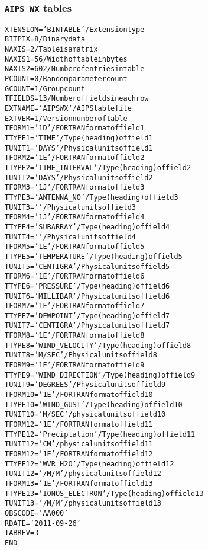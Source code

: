 \documentclass[twoside]{article}
\newcommand{\Hi}[1]{\textcolor{hicol}{#1}}
\begin{document}
\subsubsection{{\tt AIPS WX} tables}
\label{Appe:WXtable}
\begin{alltt}
XTENSION= 'BINTABLE'           / Extension type
BITPIX  =                    8 / Binary data
NAXIS   =                    2 / Table is a matrix
\Hi{NAXIS1  =                   56 / Width of table in bytes}
NAXIS2  =                  602 / Number of entries in table
PCOUNT  =                    0 / Random parameter count
GCOUNT  =                    1 / Group count
TFIELDS =                   13 / Number of fields in each row
EXTNAME = 'AIPS WX '           / AIPS table file
EXTVER  =                    1 / Version number of table
TFORM1  = '1D      '           / FORTRAN format of field  1
TTYPE1  = 'TIME            '   / Type (heading) of field  1
TUNIT1  = 'DAYS    '           / Physical units of field  1
TFORM2  = '1E      '           / FORTRAN format of field  2
TTYPE2  = 'TIME_INTERVAL   '   / Type (heading) of field  2
TUNIT2  = 'DAYS    '           / Physical units of field  2
TFORM3  = '1J      '           / FORTRAN format of field  3
TTYPE3  = 'ANTENNA_NO      '   / Type (heading) of field  3
TUNIT3  = '        '           / Physical units of field  3
TFORM4  = '1J      '           / FORTRAN format of field  4
TTYPE4  = 'SUBARRAY        '   / Type (heading) of field  4
TUNIT4  = '        '           / Physical units of field  4
TFORM5  = '1E      '           / FORTRAN format of field  5
TTYPE5  = 'TEMPERATURE     '   / Type (heading) of field  5
TUNIT5  = 'CENTIGRA'           / Physical units of field  5
TFORM6  = '1E      '           / FORTRAN format of field  6
TTYPE6  = 'PRESSURE        '   / Type (heading) of field  6
TUNIT6  = 'MILLIBAR'           / Physical units of field  6
TFORM7  = '1E      '           / FORTRAN format of field  7
TTYPE7  = 'DEWPOINT        '   / Type (heading) of field  7
TUNIT7  = 'CENTIGRA'           / Physical units of field  7
TFORM8  = '1E      '           / FORTRAN format of field  8
TTYPE8  = 'WIND_VELOCITY   '   / Type (heading) of field  8
TUNIT8  = 'M/SEC   '           / Physical units of field  8
TFORM9  = '1E      '           / FORTRAN format of field  9
TTYPE9  = 'WIND_DIRECTION  '   / Type (heading) of field  9
TUNIT9  = 'DEGREES '           / Physical units of field  9
\Hi{TFORM10 = '1E      '           / FORTRAN format of field 10}
\Hi{TTYPE10 = 'WIND_GUST       '   / Type (heading) of field 10}
\Hi{TUNIT10 = 'M/SEC   '           / physical units of field 10}
\Hi{TFORM12 = '1E      '           / FORTRAN format of field 11}
\Hi{TTYPE12 = 'Preciptation    '   / Type (heading) of field 11}
\Hi{TUNIT12 = 'CM      '           / physical units of field 11}
TFORM12 = '1E      '           / FORTRAN format of field 12
TTYPE12 = 'WVR_H2O         '   / Type (heading) of field 12
\Hi{TUNIT12 = '/M/M    '           / physical units of field 12}
TFORM13 = '1E      '           / FORTRAN format of field 13
TTYPE13 = 'IONOS_ELECTRON  '   / Type (heading) of field 13
\Hi{TUNIT13 = '/M/M    '           / physical units of field 13}
OBSCODE = 'AA000   '
RDATE   = '2011-09-26'
TABREV  =            3
END
\end{alltt}
\end{document}

